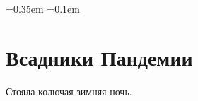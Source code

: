 \documentclass[openany, oneside]{book}
\begin{document}
\Large

\font=0.35em
\font=0.1em

\chapter*{Всадники Пандемии}

Стояла колючая зимняя ночь.
\end{document}
